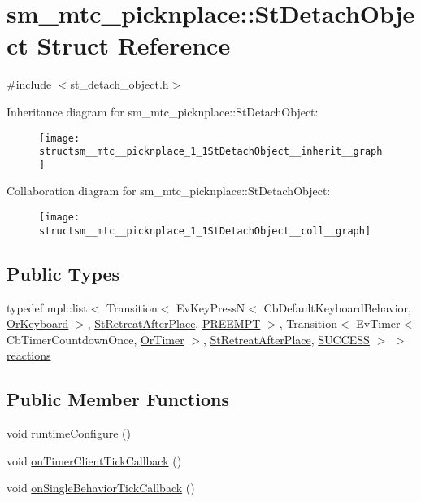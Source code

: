 \hypertarget{structsm__mtc__picknplace_1_1StDetachObject}{}\section{sm\+\_\+mtc\+\_\+picknplace\+:\+:St\+Detach\+Object Struct Reference}
\label{structsm__mtc__picknplace_1_1StDetachObject}


{\ttfamily \#include $<$st\+\_\+detach\+\_\+object.\+h$>$}



Inheritance diagram for sm\+\_\+mtc\+\_\+picknplace\+:\+:St\+Detach\+Object\+:
\nopagebreak
\begin{figure}[H]
\begin{center}
\leavevmode
\texttt{[image: structsm\_\_mtc\_\_picknplace\_1\_1StDetachObject\_\_inherit\_\_graph]}
\end{center}
\end{figure}


Collaboration diagram for sm\+\_\+mtc\+\_\+picknplace\+:\+:St\+Detach\+Object\+:
\nopagebreak
\begin{figure}[H]
\begin{center}
\leavevmode
\texttt{[image: structsm\_\_mtc\_\_picknplace\_1\_1StDetachObject\_\_coll\_\_graph]}
\end{center}
\end{figure}
\subsection*{Public Types}
\begin{DoxyCompactItemize}
\item 
typedef mpl\+::list$<$ Transition$<$ Ev\+Key\+PressN$<$ Cb\+Default\+Keyboard\+Behavior, \hyperlink{classsm__mtc__picknplace_1_1OrKeyboard}{Or\+Keyboard} $>$, \hyperlink{structsm__mtc__picknplace_1_1StRetreatAfterPlace}{St\+Retreat\+After\+Place}, \hyperlink{classPREEMPT}{P\+R\+E\+E\+M\+PT} $>$, Transition$<$ Ev\+Timer$<$ Cb\+Timer\+Countdown\+Once, \hyperlink{classsm__mtc__picknplace_1_1OrTimer}{Or\+Timer} $>$, \hyperlink{structsm__mtc__picknplace_1_1StRetreatAfterPlace}{St\+Retreat\+After\+Place}, \hyperlink{classSUCCESS}{S\+U\+C\+C\+E\+SS} $>$ $>$ \hyperlink{structsm__mtc__picknplace_1_1StDetachObject_a2d9f1674c4132c677c50092a19c67b1e}{reactions}
\end{DoxyCompactItemize}
\subsection*{Public Member Functions}
\begin{DoxyCompactItemize}
\item 
void \hyperlink{structsm__mtc__picknplace_1_1StDetachObject_a734f34adeabde0f8541bd4239546ed1a}{runtime\+Configure} ()
\item 
void \hyperlink{structsm__mtc__picknplace_1_1StDetachObject_a7e9907ca8a558a6a829f72feffcc6060}{on\+Timer\+Client\+Tick\+Callback} ()
\item 
void \hyperlink{structsm__mtc__picknplace_1_1StDetachObject_a88499652920b184cea2555c026e43e88}{on\+Single\+Behavior\+Tick\+Callback} ()
\end{DoxyCompactItemize}
